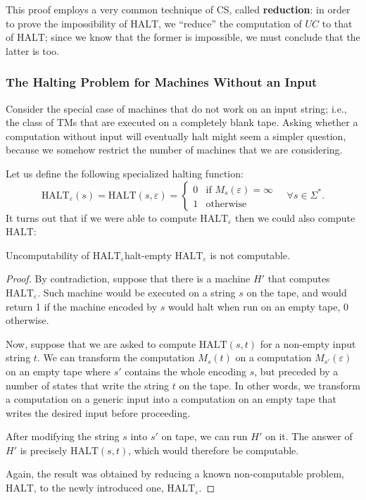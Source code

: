 \noindent This proof employs a very common technique of CS, called \textbf{reduction}: in order to prove the impossibility of \(\text{HALT}\), we ``reduce'' the computation of \(UC\) to that of \(\text{HALT}\); since we know that the former is impossible, we must conclude that the latter is too.

\subsubsection*{The Halting Problem for Machines Without an Input}
Consider the special case of machines that do not work on an input string; i.e., the class of TMs that are executed on a completely blank tape. Asking whether a computation without input will eventually halt might seem a simpler question, because we somehow restrict the number of machines that we are considering.

Let us define the following specialized halting function:
\[
\text{HALT}_\varepsilon(s) = \text{HALT}(s, \varepsilon) =
\begin{cases}
    0 & \text{if } M_s(\varepsilon) = \infty \\
    1 & \text{otherwise}
\end{cases}
\quad \forall s \in \Sigma^*.
\]
It turns out that if we were able to compute \(\text{HALT}_\varepsilon\) then we could also compute \(\text{HALT}\):

\begin{theorem}{Uncomputability of \(\text{HALT}_\varepsilon\)}{halt-empty}
    \(\text{HALT}_\varepsilon\) is not computable.
    \begin{proof}
        By contradiction, suppose that there is a machine \(H'\) that computes \(\text{HALT}_\varepsilon\). Such machine would be executed on a string \(s\) on the tape, and would return 1 if the machine encoded by \(s\) would halt when run on an empty tape, 0 otherwise.
        
        Now, suppose that we are asked to compute \(\text{HALT}(s, t)\) for a non-empty input string \(t\). We can transform the computation \(M_s(t)\) on a computation \(M_{s'}(\varepsilon)\) on an empty tape where \(s'\) contains the whole encoding \(s\), but preceded by a number of states that write the string \(t\) on the tape. In other words, we transform a computation on a generic input into a computation on an empty tape that writes the desired input before proceeding.
        
        After modifying the string \(s\) into \(s'\) on tape, we can run \(H'\) on it. The answer of \(H'\) is precisely \(\text{HALT}(s, t)\), which would therefore be computable.
        
        Again, the result was obtained by reducing a known non-computable problem, \(\text{HALT}\), to the newly introduced one, \(\text{HALT}_\varepsilon\).
    \end{proof}
\end{theorem}

